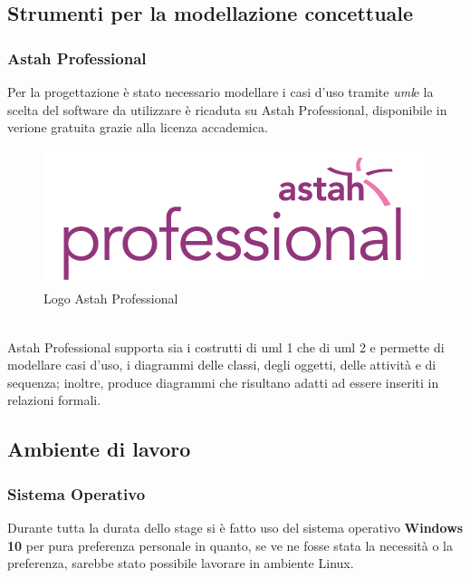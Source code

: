 \subsection{Strumenti per la modellazione concettuale}
\subsubsection{Astah Professional}
Per la progettazione è stato necessario modellare i casi d'uso tramite \emph{\gls{uml}}\glsfirstoccur e la scelta del software da utilizzare è ricaduta su Astah Professional, disponibile in verione gratuita grazie alla licenza accademica.
\begin{figure}[h]
	\centering
	\includegraphics[scale=1]{immagini/astah}
	\caption{Logo Astah Professional}
\end{figure}
\\
Astah Professional supporta sia i costrutti di \gls{uml} 1 che di \gls{uml} 2 e permette di modellare casi d’uso, i diagrammi delle classi, degli oggetti, delle attività e di sequenza; inoltre, produce diagrammi che risultano adatti ad essere inseriti in relazioni formali.
\subsection{Ambiente di lavoro}
\subsubsection{Sistema Operativo}
Durante tutta la durata dello stage si è fatto uso del sistema operativo \textbf{Windows 10} per pura preferenza personale in quanto, se ve ne fosse stata la necessità o la preferenza, sarebbe stato possibile lavorare in ambiente Linux.
